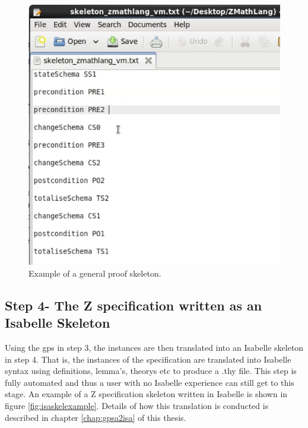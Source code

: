\begin{figure}[H]
 \begin{center}
 \includegraphics [scale=0.2]{Figures/Design/proofskel.png}
 \caption{Example of a general proof skeleton.}
 \label{fig:proofskelexample}
\end{center}
\end{figure} 

\subsection{Step 4- The Z specification written as an Isabelle Skeleton}

Using the \gls{gps} in step 3, the instances are then translated into an
Isabelle skeleton in step 4. That is, the instances of the specification are
translated into Isabelle syntax using definitions, lemma's, theorys etc to
produce a .thy file. This step is fully automated and thus a user with no
Isabelle experience can still get to this stage. An example of a Z specification
skeleton written in Isabelle is shown in figure \ref{fig:isaskelexample}.
Details of how this translation is conducted is described in chapter
\ref{chap:gpsa2isa} of this thesis.

